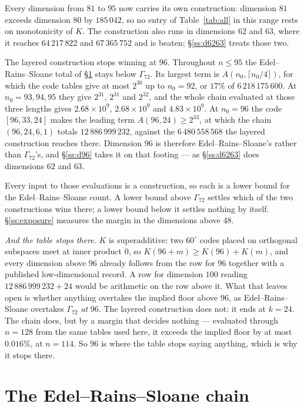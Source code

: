 \documentclass[11pt]{amsart}
\theoremstyle{remark}
\newcommand{\Gsz}{\Gamma_{72}}
\begin{document}
Every dimension from $81$ to $95$ now carries its own construction: dimension $81$
exceeds dimension $80$ by $185\,042$, so no entry of Table~\ref{tab:all} in this
range rests on monotonicity of $K$. The construction also runs in dimensions $62$
and $63$, where it reaches $64\,217\,822$ and $67\,365\,752$ and is beaten;
\S\ref{ss:d6263} treats those two.

The layered construction stops winning at $96$. Throughout $n\le95$ the
Edel--Rains--Sloane total of \S\ref{sec:ers} stays below $\Gsz$. Its largest term
is $A(n_0,\lceil n_0/4\rceil)$, for which the code tables give at most $2^{30}$
up to $n_0=92$, or $17\%$ of $6\,218\,175\,600$. At $n_0=93,94,95$ they give
$2^{31}$, $2^{31}$ and $2^{32}$, and the whole chain evaluated at those three
lengths gives $2.68\times10^9$, $2.68\times10^9$ and $4.83\times10^9$. At $n_0=96$ the
code $[96,33,24]$ makes the leading term $A(96,24)\ge2^{33}$, at which the chain
$(96,24,6,1)$ totals $12\,886\,999\,232$, against the $6\,480\,558\,568$ the
layered construction reaches there. Dimension $96$ is therefore
Edel--Rains--Sloane's rather than $\Gsz$'s, and \S\ref{ss:d96} takes it on that
footing --- as \S\ref{ss:d6263} does dimensions $62$ and $63$.

Every input to those evaluations is a construction, so each is a lower bound for
the Edel--Rains--Sloane count. A lower bound above $\Gsz$ settles which of the
two constructions wins there; a lower bound below it settles nothing by itself.
\S\ref{ss:exposure} measures the margin in the dimensions above $48$.

\emph{And the table stops there.} $K$ is superadditive: two $60^\circ$ codes placed on
orthogonal subspaces meet at inner product $0$, so $K(96+m)\ge K(96)+K(m)$, and every
dimension above $96$ already follows from the row for $96$ together with a published
low-dimensional record. A row for dimension $100$ reading $12\,886\,999\,232+24$ would be
arithmetic on the row above it. What that leaves open is whether anything overtakes the
implied floor above $96$, as Edel--Rains--Sloane overtakes $\Gsz$ \emph{at} $96$. The layered
construction does not: it ends at $k=24$. The chain does, but by a margin that decides
nothing --- evaluated through $n=128$ from the same tables used here, it exceeds the implied
floor by at most $0.016\%$, at $n=114$. So $96$ is where the table stops saying anything, which is why it
stops there.

\section{The Edel--Rains--Sloane chain}\label{sec:ers}
\end{document}
